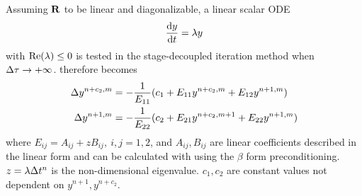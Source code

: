 \documentclass[preprint,12pt]{elsarticle}
\begin{document}
Assuming $\mathbf{R}$ to be linear and diagonalizable,
a linear scalar ODE
\begin{equation}
    \derivative{y}{t} = \lambda y
\end{equation}
with $\mathrm{Re}(\lambda)\leq 0$
is tested in the stage-decoupled iteration method when
$\mathrm\Delta \tau \rightarrow +\infty$.
 therefore becomes
\begin{equation}
    \begin{aligned}
        \mathrm\Delta y^{n+c_2, m} & = -\frac{1}{ E_{11} } (c_1 + E_{11}  y^{n+c_2, m}+ E_{12}  y^{n+1, m})     \\
        \mathrm\Delta y^{n+1, m}   & = -\frac{1}{ E_{22} } (c_2 + E_{21}  y^{n+c_2, m + 1}+ E_{22}  y^{n+1, m})
    \end{aligned}
    \label{eq:scalarGS}
\end{equation}
where $E_{ij}=A_{ij}+zB_{ij},\ i,j=1,2$, and $A_{ij}, B_{ij}$ are
linear coefficients described in the linear form 
and can be calculated with  using the $\beta$ form
preconditioning. $z=\lambda\mathrm\Delta t^n$ is the non-dimensional eigenvalue.
$c_1,c_2$ are constant values not dependent on $y^{n+1}, y^{n+c_2}$.
\end{document}
